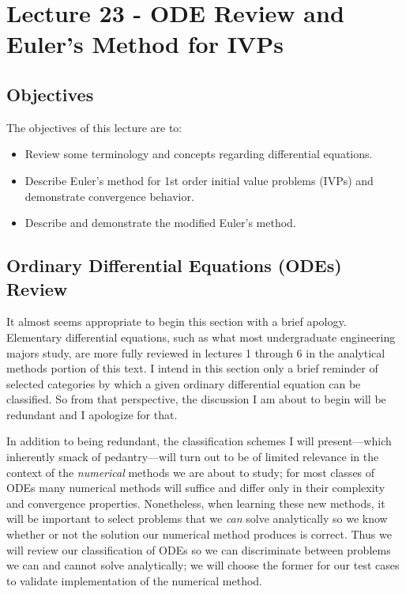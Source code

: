 \chapter{Lecture 23 - ODE Review and Euler's Method for IVPs}
\label{ch:lec23n}
\section{Objectives}
The objectives of this lecture are to:
\begin{itemize}
\item Review some terminology and concepts regarding differential equations.
\item Describe Euler's method for 1st order initial value problems (IVPs) and demonstrate convergence behavior.
\item Describe and demonstrate the modified Euler's method.
\end{itemize}
\setcounter{lstannotation}{0}

\section{Ordinary Differential Equations (ODEs) Review}

It almost seems appropriate to begin this section with a brief apology.  Elementary differential equations, such as what most undergraduate engineering majors study, are more fully reviewed in lectures 1 through 6 in the analytical methods portion of this text.  I intend in this section only a brief reminder of selected categories by which a given ordinary differential equation can be classified.  So from that perspective, the discussion I am about to begin will be redundant and I apologize for that.

In addition to being redundant, the classification schemes I will present---which inherently smack of pedantry---will turn out to be of limited relevance in the context of the \emph{numerical} methods we are about to study; for most classes of ODEs many numerical methods will suffice and differ only in their complexity and convergence properties.  Nonetheless, when learning these new methods, it will be important to select problems that we \emph{can} solve analytically so we know whether or not the solution our numerical method produces is correct.  Thus we will review our classification of ODEs so we can discriminate between problems we can and cannot solve analytically; we will choose the former for our test cases to validate implementation of the numerical method.

